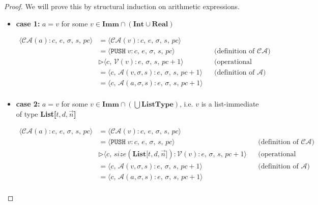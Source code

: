 \documentclass{article}
\begin{document}
\begin{proof}
We will prove this by structural induction on arithmetic expressions.

\begin{itemize}
    \item \textbf{case 1: } $a = v$ for some $v \in \textbf{Imm} \cap (\textbf{Int} \cup \textbf{Real})$

    \[
      \begin{aligned}
        \langle  \mathcal{CA}(a) : c,\, e,\, \sigma,\, s,\, pc \rangle 
        &= \langle \mathcal{CA}(v) : c,\, e,\, \sigma,\, s,\, pc \rangle \\
        &= \langle \texttt{PUSH}\;v   : c,\, e,\, \sigma,\, s,\, pc \rangle 
        && \text{(definition of } \mathcal{CA}\text{)} \\
        &\triangleright \langle c,\, \mathcal{V}(v) : e,\, \sigma,\, s,\, pc+1 \rangle 
        && \text{(operational semantics)} \\
        &= \langle c,\, \mathcal{A}(v, \sigma, s) : e,\, \sigma,\, s,\, pc+1 \rangle 
        && \text{(definition of } \mathcal{A}\text{)} \\
        &= \langle c,\, \mathcal{A}(a, \sigma, s) : e,\, \sigma,\, s,\, pc+1 \rangle \\
      \end{aligned}
  \]

  \item \textbf{case 2: } $a = v$ for some $v \in \textbf{Imm} \cap (\bigcup \textbf{ListType})$, i.e. $v$ is a list-immediate of type \textbf{List[$t, d, \vec{n}$]}

    \[
      \begin{aligned}
        \langle  \mathcal{CA}(a) : c,\, e,\, \sigma,\, s,\, pc \rangle 
        &= \langle \mathcal{CA}(v) : c,\, e,\, \sigma,\, s,\, pc \rangle \\
        &= \langle \texttt{PUSH}\;v   : c,\, e,\, \sigma,\, s,\, pc \rangle 
        && \text{(definition of } \mathcal{CA}\text{)} \\
        &\triangleright \langle c,\, size(\textbf{List[$t, d, \vec{n}$]}) : \mathcal{V}(v) : e,\, \sigma,\, s,\, pc+1 \rangle 
        && \text{(operational semantics)} \\
        &= \langle c,\, \mathcal{A}(v, \sigma, s) : e,\, \sigma,\, s,\, pc+1 \rangle 
        && \text{(definition of } \mathcal{A}\text{)} \\
        &= \langle c,\, \mathcal{A}(a, \sigma, s) : e,\, \sigma,\, s,\, pc+1 \rangle \\
      \end{aligned}
  \]


\end{itemize}
\end{proof}
\end{document}
